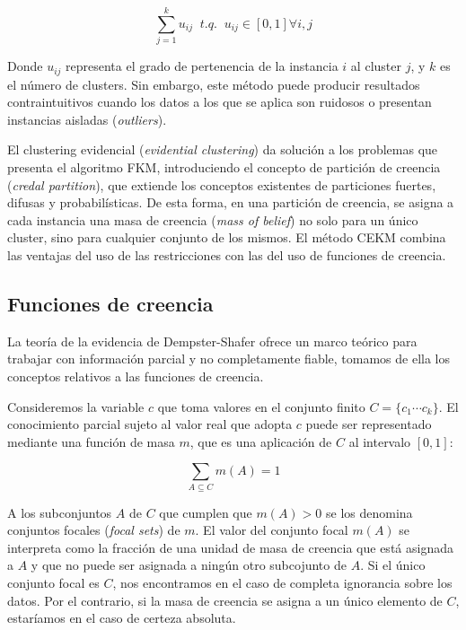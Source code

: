\begin{equation}
\sum_{j=1}^{k} u_{ij} \;\; t.q. \;\; u_{ij} \in [0,1] \forall i,j
\label{eqn2}
\end{equation}

Donde $u_{ij}$ representa el grado de pertenencia de la instancia $i$ al cluster $j$, y $k$ es el número de clusters. Sin embargo, este método puede producir resultados contraintuitivos cuando los datos a los que se aplica son ruidosos o presentan instancias aisladas (\textit{outliers}).

El clustering evidencial (\textit{evidential clustering}) da solución a los problemas que presenta el algoritmo \acs{FKM}, introduciendo el concepto de partición de creencia (\textit{credal partition}), que extiende los conceptos existentes de particiones fuertes, difusas y probabilísticas. De esta forma, en una partición de creencia, se asigna a cada instancia una masa de creencia (\textit{mass of belief}) no solo para un único cluster, sino para cualquier conjunto de los mismos. El método \acs{CEKM} combina las ventajas del uso de las restricciones con las del uso de funciones de creencia.

\subsection{Funciones de creencia}

La teoría de la evidencia de Dempster-Shafer ofrece un marco teórico para trabajar con información parcial y no completamente fiable, tomamos de ella los conceptos relativos a las funciones de creencia.

Consideremos la variable $c$ que toma valores en el conjunto finito $C = \{c_1 \cdots c_k \}$. El conocimiento parcial sujeto al valor real que adopta $c$ puede ser representado mediante una función de masa $m$, que es una aplicación de $C$ al intervalo $[0,1]$:

\begin{equation}
\sum_{A \subseteq C} m(A) = 1
\label{eqn3}
\end{equation}

A los subconjuntos $A$ de $C$ que cumplen que $m(A) > 0$ se los denomina conjuntos focales (\textit{focal sets}) de $m$. El valor del conjunto focal $m(A)$ se interpreta como la fracción de una unidad de masa de creencia que está asignada a $A$ y que no puede ser asignada a ningún otro subcojunto de $A$. Si el único conjunto focal es $C$, nos encontramos en el caso de completa ignorancia sobre los datos. Por el contrario, si la masa de creencia se asigna a un único elemento de $C$, estaríamos en el caso de certeza absoluta.

